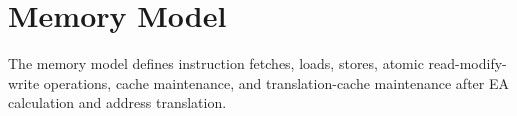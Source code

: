 \clearpage
\section{Memory Model}\label{page:memory-model}

The memory model defines instruction fetches, loads, stores, atomic read-modify-write operations, cache maintenance,
and translation-cache maintenance after EA calculation and address translation.

